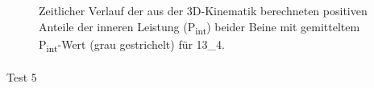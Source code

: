 \documentclass[
  letterpaper,
  DIV=11]{scrartcl}
\makeatletter
\let\oldparagraph\paragraph
\renewcommand{\paragraph}{
    \@ifstar
      \xxxParagraphStar
      \xxxParagraphNoStar
  }
\newcommand{\xxxParagraphStar}[1]{\oldparagraph*{#1}\mbox{}}
\newcommand{\xxxParagraphNoStar}[1]{\oldparagraph{#1}\mbox{}}
\makeatother
\begin{document}
\begin{figure}


\caption{\label{fig-PInt_Kinematik_13_4}Zeitlicher Verlauf der aus der
3D-Kinematik berechneten positiven Anteile der inneren Leistung
(P\textsubscript{int}) beider Beine mit gemitteltem
P\textsubscript{int}-Wert (grau gestrichelt) für 13\_4.}

\end{figure}%

\paragraph{Test 5}
\end{document}
